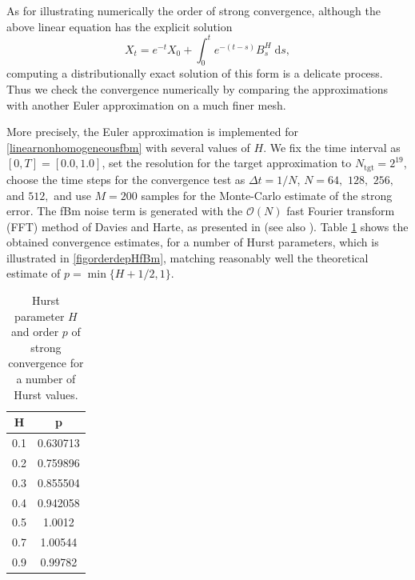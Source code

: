 \documentclass[reqno,12pt]{amsart}
\theoremstyle{plain} %
\theoremstyle{definition} %
\begin{document}
As for illustrating numerically the order of strong convergence, although the above linear equation has the explicit solution
\begin{equation}
    X_t = e^{-t}X_0 + \int_0^t e^{-(t-s)}B^H_s\;\mathrm{d}s,
\end{equation}
computing a distributionally exact solution of this form is a delicate process. Thus we check the convergence numerically by comparing the approximations with another Euler approximation on a much finer mesh.

More precisely, the Euler approximation is implemented for \eqref{linearnonhomogeneousfbm} with several values of $H$. We fix the time interval as $[0, T] = [0.0, 1.0]$, set the resolution for the target approximation to $N_{\textrm{tgt}} = 2^{19}$, choose the time steps for the convergence test as $\Delta t = 1/N$,  $N = 64,$ $128,$ $256,$ and $512,$ and use $M=200$ samples for the Monte-Carlo estimate of the strong error. The fBm noise term is generated with the $\mathcal{O}(N)$ fast Fourier transform (FFT) method of Davies and Harte, as presented in \cite{DiekerMandjes2003} (see also \cite[Section 14.4]{HanKloeden2017}). Table \ref{taborderdepHfBm} shows the obtained convergence estimates, for a number of Hurst parameters, which is illustrated in \cref{figorderdepHfBm}, matching reasonably well the theoretical estimate of $p = \min\{H+1/2, 1\}.$

\begin{table}
    \begin{tabular}[htb]{|c|c|}
        \hline H & p \\
        \hline \hline
        0.1 & 0.630713 \\
        0.2  & 0.759896 \\
        0.3  & 0.855504 \\
        0.4  & 0.942058 \\
        0.5  & 1.0012 \\
        0.7  & 1.00544 \\
        0.9  & 0.99782 \\
        \hline
    \end{tabular}
    \bigskip

    \caption{Hurst parameter $H$ and order $p$ of strong convergence for a number of Hurst values.}
    \label{taborderdepHfBm}
\end{table}
\end{document}
